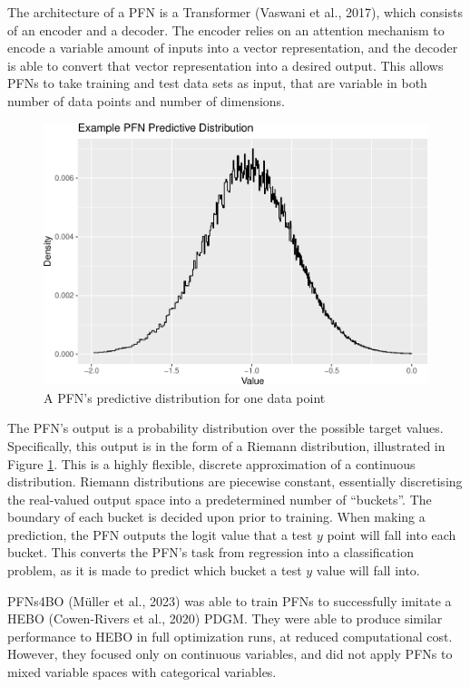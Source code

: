 \documentclass[12pt,twoside]{reedthesis}
\begin{document}
The architecture of a PFN is a Transformer (Vaswani et al., 2017), which consists of an encoder and a decoder. The encoder relies on an attention mechanism to encode a variable amount of inputs into a vector representation, and the decoder is able to convert that vector representation into a desired output. This allows PFNs to take training and test data sets as input, that are variable in both number of data points and number of dimensions.
\begin{figure}
\centering
\includegraphics{thesis_files/figure-latex/example-pfn-pdf-1.pdf}
\caption{\label{fig:example-pfn-pdf}A PFN's predictive distribution for one data point}
\end{figure}
The PFN's output is a probability distribution over the possible target values. Specifically, this output is in the form of a Riemann distribution, illustrated in Figure \ref{fig:example-pfn-pdf}. This is a highly flexible, discrete approximation of a continuous distribution. Riemann distributions are piecewise constant, essentially discretising the real-valued output space into a predetermined number of ``buckets''. The boundary of each bucket is decided upon prior to training. When making a prediction, the PFN outputs the logit value that a test \(y\) point will fall into each bucket. This converts the PFN's task from regression into a classification problem, as it is made to predict which bucket a test \(y\) value will fall into.

PFNs4BO (Müller et al., 2023) was able to train PFNs to successfully imitate a HEBO (Cowen-Rivers et al., 2020) PDGM. They were able to produce similar performance to HEBO in full optimization runs, at reduced computational cost. However, they focused only on continuous variables, and did not apply PFNs to mixed variable spaces with categorical variables.
\end{document}
